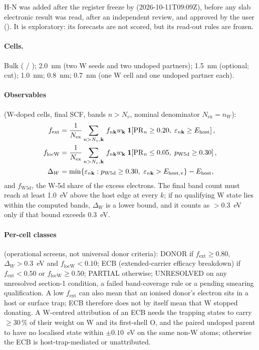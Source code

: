 H-N was added after the register freeze by  (2026-10-11T09:09Z), before any slab electronic result was read,
after an independent review, and approved by the user (). It is exploratory: its forecasts are not scored,
but its read-out rules are frozen.

\paragraph{Cells.} Bulk ( / ); 2.0~nm (two W seeds and two undoped partners);
1.5~nm (optional; cut); 1.0~nm; 0.8~nm; 0.7~nm (one W cell and one undoped partner each).

\paragraph{Observables} (W-doped cells, final SCF, bands $n>N_v$, nominal denominator $N_{\mathrm{ex}} = n_W$):
\begin{align}
f_{\mathrm{ext}} &= \frac{1}{N_{\mathrm{ex}}}\sum_{n>N_v,\vk}\, f_{n\vk}w_{\vk}\;
  \mathbf{1}\!\left[\PRn \ge 0.20,\; \varepsilon_{n\vk} \ge E_{\mathrm{host}}\right], \label{eq:mono-am-fext}\\
f_{\mathrm{locW}} &= \frac{1}{N_{\mathrm{ex}}}\sum_{n>N_v,\vk}\, f_{n\vk}w_{\vk}\;
  \mathbf{1}\!\left[\PRn \le 0.05,\; p_{\mathrm{W5d}} \ge 0.30\right], \label{eq:mono-am-flocw}\\
\Delta_W &= \min\{\varepsilon_{n\vk} : p_{\mathrm{W5d}} \ge 0.30,\ \varepsilon_{n\vk} > E_{\mathrm{host,v}}\} -
E_{\mathrm{host}}, \label{eq:mono-am-dw}
\end{align}
and $f_{\mathrm{W5d}}$, the W-5d share of the excess electrons. The final band count must reach at least 1.0~eV above
the host edge at every $k$; if no qualifying W state lies within the computed bands, $\Delta_W$ is a lower bound, and it
counts as $>0.3$~eV only if that bound exceeds 0.3~eV.

\paragraph{Per-cell classes} (operational screens, not universal donor criteria):
DONOR if $f_{\mathrm{ext}}\ge0.80$, $\Delta_W>0.3$~eV and $f_{\mathrm{locW}}<0.10$; ECB (extended-carrier efficacy
breakdown) if $f_{\mathrm{ext}}<0.50$ or $f_{\mathrm{locW}}\ge0.50$; PARTIAL otherwise; UNRESOLVED on any unresolved
section-1 condition, a failed band-coverage rule or a pending smearing qualification. A low $f_{\mathrm{ext}}$ can also
mean that an ionised donor's electron sits in a host or surface trap; ECB therefore does not by itself mean that W
stopped donating. A W-centred attribution of an ECB needs the trapping states to carry $\ge30$\,\% of their weight on W
and its first-shell O, and the paired undoped parent to have no localised state within $\pm0.10$~eV on the same non-W
atoms; otherwise the ECB is host-trap-mediated or unattributed.

